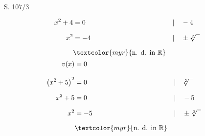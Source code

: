 \begin{Exercise}{S. 107/3}{}
\begin{enumerate}
\begin{enumerate}[label=\alph*),leftmargin=*]
{\begin{itemize}[leftmargin=*]
{\begin{minipage}[t]{0.45\linewidth}
\begin{align*}
                            x^{2} + 4 &= 0 &&| \quad -4\\[1.5ex]
                            x^{2} &= -4 &&| \quad \pm \sqrt[2]{\phantom{x}}\\[1.5ex]
                            & \textcolor{myr}{\text{n. d. in } \mathbb{R}}\\[-1.5ex]
                        \end{align*}
                    \end{minipage}
                    \hfill
                    \begin{minipage}[t]{0.45\linewidth}
                        \vspace{-2.0ex}
                        \begin{align*}
                            v(x) &= 0 \\[2.0ex]
                            \left(x^{2} + 5 \right)^{2} &= 0 &&| \quad \sqrt[2]{\phantom{x}}\\[1.5ex]
                            x^{2} + 5 &= 0 &&| \quad -5\\[1.5ex]
                            x^{2} &= -5 &&| \quad \pm \sqrt[2]{\phantom{x}}\\[1.5ex]
                            & \textcolor{myr}{\text{n. d. in } \mathbb{R}}\\[-1.5ex]
                        \end{align*}
                    \end{minipage}
                    \\[2.0ex]
}
\end{itemize}}
\end{enumerate}
\end{enumerate}
\end{Exercise}
